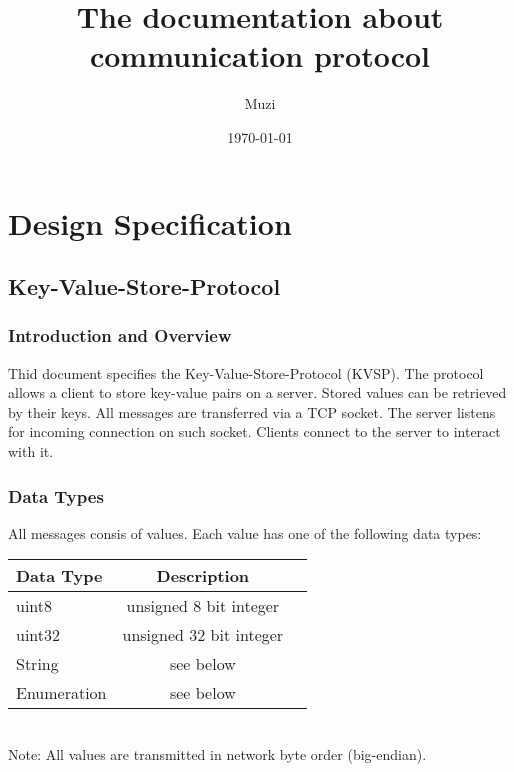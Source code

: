 \documentclass{article}
\title{The documentation about communication protocol}
\author{Muzi}
\date{\today}
\begin{document}
\maketitle
\tableofcontents

\section{Design Specification}
\subsection{Key-Value-Store-Protocol}
\subsubsection{Introduction and Overview}
Thid document specifies the Key-Value-Store-Protocol (KVSP). The protocol allows a client to store key-value pairs on a server.
Stored values can be retrieved by their keys. All messages are transferred via a TCP socket. The server listens for incoming connection on such socket.
Clients connect to the server to interact with it.
\subsubsection{Data Types}
All messages consis of values. Each value has one of the following data types:
\begin{tabular}{|l|c|r|}
    \hline
    Data Type & Description\\
    \hline
    uint8 & unsigned 8 bit integer \\
    uint32 & unsigned 32 bit integer \\
    String & see below \\
    Enumeration & see below \\
    \hline
\end{tabular} \\
Note: All values are transmitted in network byte order (big-endian).
\end{document}
